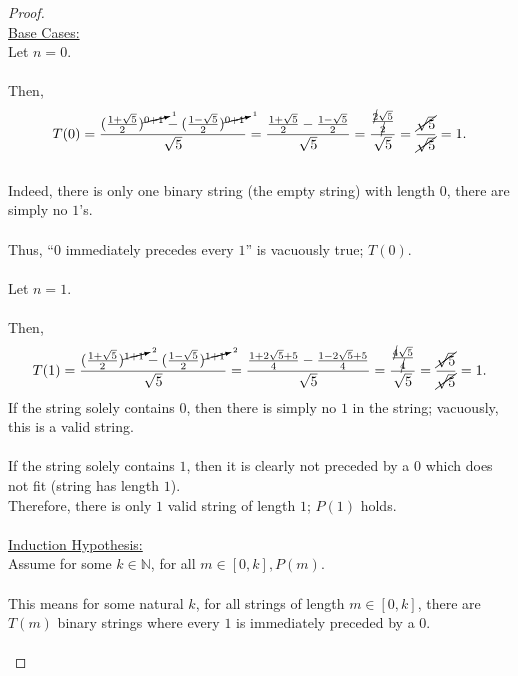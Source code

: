 \documentclass[12pt]{article}
\begin{document}
\begin{proof}
\leavevmode\\
    \underline{Base Cases:} \\
    Let $n = 0$. \\
    \\
    Then,
    \large
    \[
        T(0) = \frac{(\frac{1 + \sqrt{5}}{2})^{\cancelto{1}{0 + 1}} - (\frac{1 - \sqrt{5}}{2})^{\cancelto{1}{0 + 1}}}{\sqrt{5}}
        = \frac{\frac{1 + \sqrt{5}}{2} - \frac{1 - \sqrt{5}}{2}}{\sqrt{5}}
        = \frac{\frac{\cancel{2} \sqrt{5}}{\cancel{2}}}{\sqrt{5}}
        = \frac{\cancel{\sqrt{5}}}{\cancel{\sqrt{5}}}
        = 1 \text{.}
    \]
    \normalsize
    \\
    Indeed, there is only one binary string (the empty string) with length $0$, there are simply no $1$'s. \\
    \\
    Thus, ``$0$ immediately precedes every $1$'' is vacuously true; $T(0)$. \\
    \\
    Let $n = 1$. \\
    \\
    Then,
    \large
    \[
        T(1) = \frac{(\frac{1 + \sqrt{5}}{2})^{\cancelto{2}{1 + 1}} - (\frac{1 - \sqrt{5}}{2})^{\cancelto{2}{1 + 1}}}{\sqrt{5}}
        = \frac{\frac{1 + 2 \sqrt{5} + 5}{4} - \frac{1 - 2 \sqrt{5} + 5}{4}}{\sqrt{5}}
        = \frac{\frac{\cancel{4} \sqrt{5}}{\cancel{4}}}{\sqrt{5}}
        = \frac{\cancel{\sqrt{5}}}{\cancel{\sqrt{5}}}
        = 1 \text{.}
    \]
    \normalsize
    If the string solely contains $0$, then there is simply no $1$ in the string; vacuously, this is a valid string. \\
    \\ 
    If the string solely contains $1$, then it is clearly not preceded by a $0$ which does not fit (string has length $1$).
    \\
    Therefore, there is only $1$ valid string of length $1$; $P(1)$ holds. \\
    \\
    \underline{Induction Hypothesis:} \\
    Assume for some $k \in \mathbb{N}$, for all $m \in [0, k], P(m)$. \\
    \\
    This means for some natural $k$, for all strings of length $m \in [0, k]$, there are $T(m)$ binary strings where every $1$ is immediately preceded by a $0$. \\
    \\

\end{proof}
\end{document}
